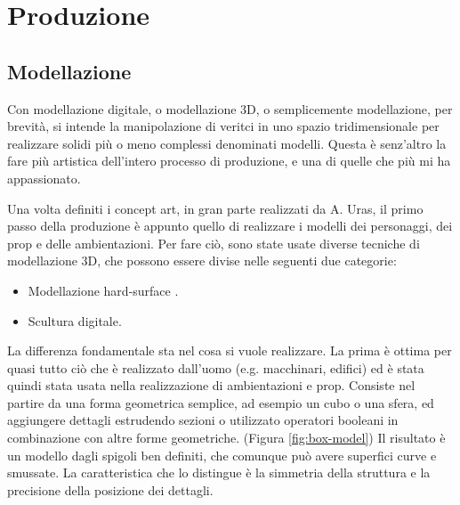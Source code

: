 
\chapter{Produzione} %

\label{Chapter5} %


\section{Modellazione}

Con modellazione digitale, o modellazione 3D, o semplicemente modellazione, per brevità, si intende la manipolazione di veritci in uno spazio tridimensionale per realizzare solidi più o meno complessi denominati modelli.
Questa è senz'altro la fare più artistica dell'intero processo di produzione, e una di quelle che più mi ha appassionato.

Una volta definiti i concept art, in gran parte realizzati da A. Uras, il primo passo della produzione è appunto quello di realizzare i modelli dei personaggi, dei prop e delle ambientazioni.
Per fare ciò, sono state usate diverse tecniche di modellazione 3D, che possono essere divise nelle seguenti due categorie:
\begin{itemize}
    \item Modellazione hard-surface \cite{hardSurf}.
    \item Scultura digitale\cite{3Dsculpt}.
\end{itemize}
La differenza fondamentale sta nel cosa si vuole realizzare. La prima è ottima per quasi tutto ciò che è realizzato dall'uomo (e.g. macchinari, edifici) ed è stata quindi stata usata nella realizzazione di ambientazioni e prop.
Consiste nel partire da una forma geometrica semplice, ad esempio un cubo o una sfera, ed aggiungere dettagli estrudendo sezioni o utilizzato operatori booleani in combinazione con altre forme geometriche. (Figura \ref{fig:box-model})
Il risultato è un modello dagli spigoli ben definiti, che comunque può avere superfici curve e smussate.
La caratteristica che lo distingue è la simmetria della struttura e la precisione della posizione dei dettagli. 

